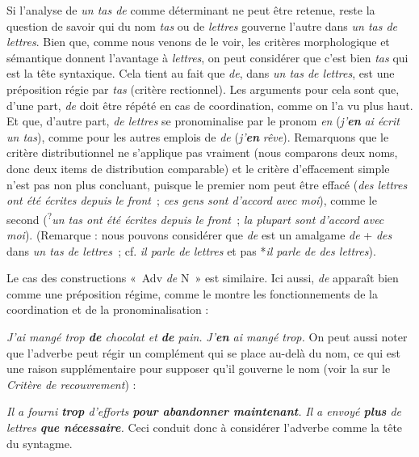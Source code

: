 {    Si l’analyse de \textit{un tas de} comme déterminant ne peut être retenue, reste la question de savoir qui du nom \textit{tas} ou de \textit{lettres} gouverne l’autre dans \textit{un tas de lettres}. Bien que, comme nous venons de le voir, les critères morphologique et sémantique donnent l’avantage à \textit{lettres}, on peut considérer que c’est bien \textit{tas} qui est la tête syntaxique. Cela tient au fait que \textit{de}, dans \textit{un tas de lettres}, est une préposition régie par \textit{tas} (critère rectionnel). Les arguments pour cela sont que, d’une part, \textit{de} doit être répété en cas de coordination, comme on l’a vu plus haut. Et que, d’autre part, \textit{de lettres} se pronominalise par le pronom \textit{en} (\textit{j’}\textbf{\textit{en}} \textit{ai écrit un tas}), comme pour les autres emplois de \textit{de} (\textit{j’}\textbf{\textit{en}} \textit{rêve}). Remarquons que le critère distributionnel ne s’applique pas vraiment (nous comparons deux noms, donc deux items de distribution comparable) et le critère d’effacement simple n’est pas non plus concluant, puisque le premier nom peut être effacé (\textit{des lettres ont été écrites depuis le front~}; \textit{ces gens sont d’accord} \textit{avec moi}), comme le second (\textsuperscript{?}\textit{un tas ont été écrites depuis le front~}; \textit{la plupart sont d’accord} \textit{avec moi}). (Remarque : nous pouvons considérer que \textit{de} est un amalgame \textit{de} + \textit{des} dans \textit{un tas de lettres~}; cf. \textit{il parle de lettres} et pas *\textit{il parle de des lettres}).

    Le cas des constructions «~Adv \textit{de} N~» est similaire. Ici aussi, \textit{de} apparaît bien comme une préposition régime, comme le montre les fonctionnements de la coordination et de la pronominalisation :
    
    \ea
      \ea \textit{{J’ai mangé trop} \textbf{{de}} {chocolat et} \textbf{{de}}  {pain.}}
      \ex \textit{{J’}\textbf{{en}} ai mangé trop.}
      \z
    \z
    On peut aussi noter que l’adverbe peut régir un complément qui se place au-delà du nom, ce qui est une raison supplémentaire pour supposer qu’il gouverne le nom (voir la  sur le \textit{Critère de recouvrement}) :
    
    \ea
      \ea \textit{{Il a fourni} \textbf{{trop}}  {d’efforts} \textbf{{pour abandonner maintenant}}.}
      \ex \textit{{Il a envoyé} \textbf{{plus}}  {de lettres} \textbf{{que nécessaire}}.}
      \z
    \z
    Ceci conduit donc à considérer l’adverbe comme la tête du syntagme.

}

